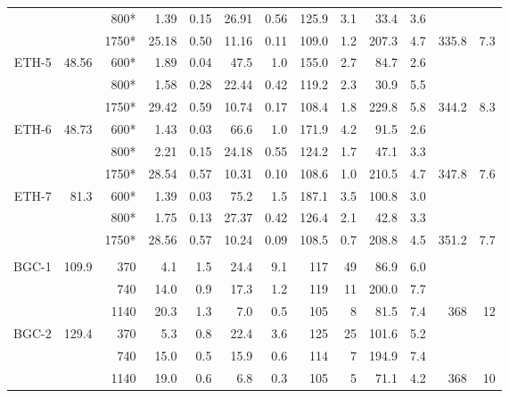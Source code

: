 \documentclass[authoryear,review,12pt]{elsarticle}
\begin{document}
\begin{table}
\begin{tabular}{|r|rrrrrrrrrrrr|}
          &       & 800*  & 1.39  & 0.15  & 26.91 & 0.56  & 125.9 & 3.1   & 33.4  & 3.6   &       &  \\
          &       & 1750* & 25.18 & 0.50  & 11.16 & 0.11  & 109.0 & 1.2   & 207.3 & 4.7   & 335.8 & 7.3 \\
    ETH-5 & 48.56 & 600*  & 1.89  & 0.04  & 47.5  & 1.0   & 155.0 & 2.7   & 84.7  & 2.6   &       &  \\
          &       & 800*  & 1.58  & 0.28  & 22.44 & 0.42  & 119.2 & 2.3   & 30.9  & 5.5   &       &  \\
          &       & 1750* & 29.42 & 0.59  & 10.74 & 0.17  & 108.4 & 1.8   & 229.8 & 5.8   & 344.2 & 8.3 \\
    ETH-6 & 48.73 & 600*  & 1.43  & 0.03  & 66.6  & 1.0   & 171.9 & 4.2   & 91.5  & 2.6   &       &  \\
          &       & 800*  & 2.21  & 0.15  & 24.18 & 0.55  & 124.2 & 1.7   & 47.1  & 3.3   &       &  \\
          &       & 1750* & 28.54 & 0.57  & 10.31 & 0.10  & 108.6 & 1.0   & 210.5 & 4.7   & 347.8 & 7.6 \\
    ETH-7 & 81.3  & 600*  & 1.39  & 0.03  & 75.2  & 1.5   & 187.1 & 3.5   & 100.8 & 3.0   &       &  \\
          &       & 800*  & 1.75  & 0.13  & 27.37 & 0.42  & 126.4 & 2.1   & 42.8  & 3.3   &       &  \\
          &       & 1750* & 28.56 & 0.57  & 10.24 & 0.09  & 108.5 & 0.7   & 208.8 & 4.5   & 351.2 & 7.7 \\
          &       &       &       &       &       &       &       &       &       &       &       &  \\
    BGC-1 & 109.9 & 370   & 4.1   & 1.5   & 24.4  & 9.1   & 117   & 49    & 86.9  & 6.0   &       &  \\
          &       & 740   & 14.0  & 0.9   & 17.3  & 1.2   & 119   & 11    & 200.0 & 7.7   &       &  \\
          &       & 1140  & 20.3  & 1.3   & 7.0   & 0.5   & 105   & 8     & 81.5  & 7.4   & 368   & 12 \\
    BGC-2 & 129.4 & 370   & 5.3   & 0.8   & 22.4  & 3.6   & 125   & 25    & 101.6 & 5.2   &       &  \\
          &       & 740   & 15.0  & 0.5   & 15.9  & 0.6   & 114   & 7     & 194.9 & 7.4   &       &  \\
          &       & 1140  & 19.0  & 0.6   & 6.8   & 0.3   & 105   & 5     & 71.1  & 4.2   & 368   & 10 \\

\end{tabular}
\end{table}
\end{document}

